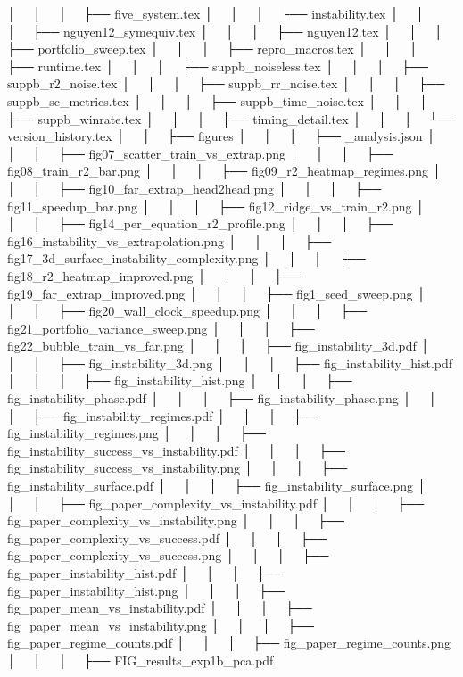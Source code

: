 │   │       │       ├── five_system.tex
│   │       │       ├── instability.tex
│   │       │       ├── nguyen12_symequiv.tex
│   │       │       ├── nguyen12.tex
│   │       │       ├── portfolio_sweep.tex
│   │       │       ├── repro_macros.tex
│   │       │       ├── runtime.tex
│   │       │       ├── suppb_noiseless.tex
│   │       │       ├── suppb_r2_noise.tex
│   │       │       ├── suppb_rr_noise.tex
│   │       │       ├── suppb_sc_metrics.tex
│   │       │       ├── suppb_time_noise.tex
│   │       │       ├── suppb_winrate.tex
│   │       │       ├── timing_detail.tex
│   │       │       └── version_history.tex
│   │       ├── figures
│   │       │   ├── _analysis.json
│   │       │   ├── fig07_scatter_train_vs_extrap.png
│   │       │   ├── fig08_train_r2_bar.png
│   │       │   ├── fig09_r2_heatmap_regimes.png
│   │       │   ├── fig10_far_extrap_head2head.png
│   │       │   ├── fig11_speedup_bar.png
│   │       │   ├── fig12_ridge_vs_train_r2.png
│   │       │   ├── fig14_per_equation_r2_profile.png
│   │       │   ├── fig16_instability_vs_extrapolation.png
│   │       │   ├── fig17_3d_surface_instability_complexity.png
│   │       │   ├── fig18_r2_heatmap_improved.png
│   │       │   ├── fig19_far_extrap_improved.png
│   │       │   ├── fig1_seed_sweep.png
│   │       │   ├── fig20_wall_clock_speedup.png
│   │       │   ├── fig21_portfolio_variance_sweep.png
│   │       │   ├── fig22_bubble_train_vs_far.png
│   │       │   ├── fig_instability_3d.pdf
│   │       │   ├── fig_instability_3d.png
│   │       │   ├── fig_instability_hist.pdf
│   │       │   ├── fig_instability_hist.png
│   │       │   ├── fig_instability_phase.pdf
│   │       │   ├── fig_instability_phase.png
│   │       │   ├── fig_instability_regimes.pdf
│   │       │   ├── fig_instability_regimes.png
│   │       │   ├── fig_instability_success_vs_instability.pdf
│   │       │   ├── fig_instability_success_vs_instability.png
│   │       │   ├── fig_instability_surface.pdf
│   │       │   ├── fig_instability_surface.png
│   │       │   ├── fig_paper_complexity_vs_instability.pdf
│   │       │   ├── fig_paper_complexity_vs_instability.png
│   │       │   ├── fig_paper_complexity_vs_success.pdf
│   │       │   ├── fig_paper_complexity_vs_success.png
│   │       │   ├── fig_paper_instability_hist.pdf
│   │       │   ├── fig_paper_instability_hist.png
│   │       │   ├── fig_paper_mean_vs_instability.pdf
│   │       │   ├── fig_paper_mean_vs_instability.png
│   │       │   ├── fig_paper_regime_counts.pdf
│   │       │   ├── fig_paper_regime_counts.png
│   │       │   ├── FIG_results_exp1b_pca.pdf
